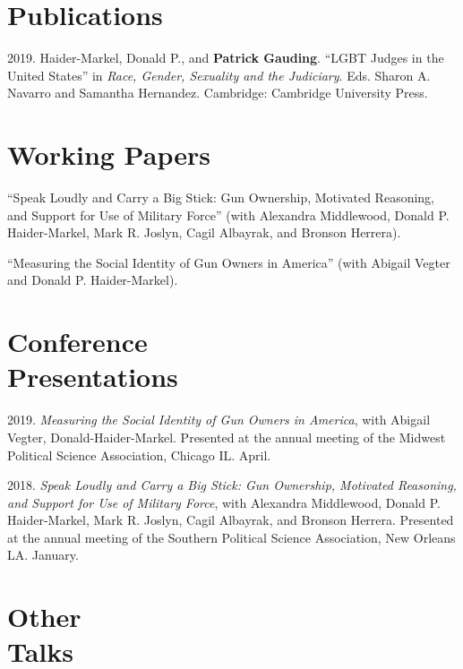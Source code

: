 \documentclass[margin,line,pifont,palatino,courier]{res}
\newenvironment{list1}{
  \begin{list}{\ding{113}}{%
      \setlength{\itemsep}{0in}
      \setlength{\parsep}{0in} \setlength{\parskip}{0in}
      \setlength{\topsep}{0in} \setlength{\partopsep}{0in}
      \setlength{\leftmargin}{0.17in}}}{\end{list}}
\newenvironment{list2}{
  \begin{list}{$\bullet$}{%
      \setlength{\itemsep}{0in}
      \setlength{\parsep}{0in} \setlength{\parskip}{0in}
      \setlength{\topsep}{0in} \setlength{\partopsep}{0in}
      \setlength{\leftmargin}{0.2in}}}{\end{list}}
\begin{document}
\begin{resume}
\begin{list1}

\end{list1}


\section{\sc Publications}

2019. Haider-Markel, Donald P., and \textbf{Patrick Gauding}. ``LGBT Judges
in the United States'' in \textit{Race, Gender, Sexuality and the
  Judiciary}. Eds. Sharon A. Navarro  and Samantha
Hernandez. Cambridge: Cambridge University Press.

\section{\sc Working Papers}

``Speak Loudly and Carry a Big Stick: Gun Ownership, Motivated
Reasoning, and Support for Use of Military Force'' (with Alexandra
Middlewood, Donald P. Haider-Markel, Mark R. Joslyn, Cagil Albayrak,
and Bronson Herrera).

``Measuring the Social Identity of Gun Owners in America'' (with
Abigail Vegter and Donald P. Haider-Markel).

\section{\sc Conference \\ Presentations}

2019. \emph{Measuring the Social Identity of Gun Owners in America},
with Abigail Vegter, Donald-Haider-Markel. Presented at the annual
meeting of the Midwest Political Science Association, Chicago IL. April.

2018. \emph{Speak Loudly and Carry a Big Stick: Gun Ownership, Motivated
  Reasoning, and Support for Use of Military Force}, with Alexandra
Middlewood, Donald P. Haider-Markel, Mark R. Joslyn, Cagil Albayrak,
and Bronson Herrera. Presented at the annual meeting of the Southern
Political Science Association, New Orleans LA. January.

\section{\sc Other\\ Talks}


\end{resume}
\end{document}
